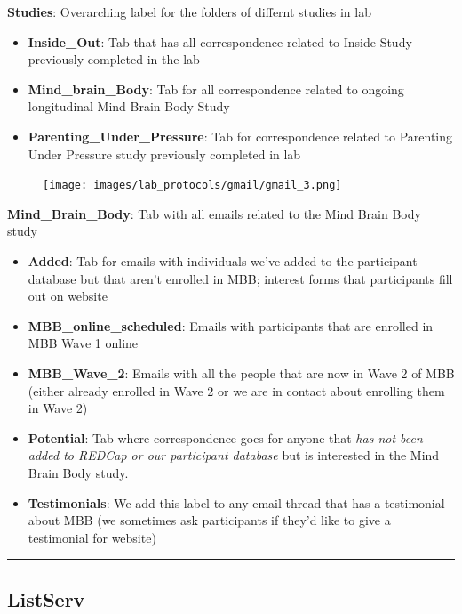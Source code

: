 \documentclass[
]{book}
\begin{document}
\textbf{Studies}: Overarching label for the folders of differnt studies in lab

\begin{itemize}
\item
  \textbf{Inside\_Out}: Tab that has all correspondence related to Inside Study previously completed in the lab
\item
  \textbf{Mind\_brain\_Body}: Tab for all correspondence related to ongoing longitudinal Mind Brain Body Study
\item
  \textbf{Parenting\_Under\_Pressure}: Tab for correspondence related to Parenting Under Pressure study previously completed in lab
\end{itemize}

\begin{figure}
\centering
\texttt{[image: images/lab\_protocols/gmail/gmail\_3.png]}
\caption{}
\end{figure}

\textbf{Mind\_Brain\_Body}: Tab with all emails related to the Mind Brain Body study

\begin{itemize}
\item
  \textbf{Added}: Tab for emails with individuals we've added to the participant database but that aren't enrolled in MBB; interest forms that participants fill out on website
\item
  \textbf{MBB\_online\_scheduled}: Emails with participants that are enrolled in MBB Wave 1 online
\item
  \textbf{MBB\_Wave\_2}: Emails with all the people that are now in Wave 2 of MBB (either already enrolled in Wave 2 or we are in contact about enrolling them in Wave 2)
\item
  \textbf{Potential}: Tab where correspondence goes for anyone that \emph{has not been added to REDCap or our participant database} but is interested in the Mind Brain Body study.
\item
  \textbf{Testimonials}: We add this label to any email thread that has a testimonial about MBB (we sometimes ask participants if they'd like to give a testimonial for website)
\end{itemize}

\begin{center}\rule{0.5\linewidth}{0.5pt}\end{center}

\hypertarget{listserv}{%
\subsection{ListServ}\label{listserv}}
\end{document}

